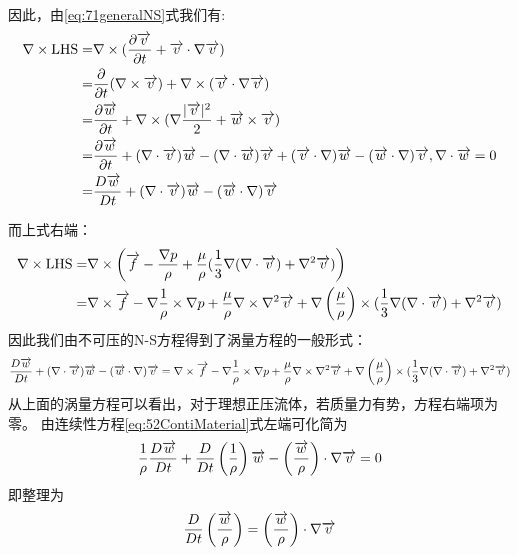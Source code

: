 因此，由\eqref{eq:71generalNS}式我们有:
\begin{align*}
\nabla\times \text{LHS}=& \nabla\times (\frac{\partial \overrightarrow{v}}{\partial t}+\overrightarrow{v}\cdot\nabla\overrightarrow{v})\\
=& \frac{\partial }{\partial t}(\nabla\times \overrightarrow{v})+\nabla\times(\overrightarrow{v}\cdot\nabla\overrightarrow{v}) \\
=& \frac{\partial \overrightarrow{w}}{\partial t}+\nabla\times(\nabla \frac{|\overrightarrow{v}|^2}{2}+\overrightarrow{w}\times \overrightarrow{v})\\
=& \frac{\partial \overrightarrow{w}}{\partial t} +(\nabla\cdot\overrightarrow{v})\overrightarrow{w}-(\nabla\cdot\overrightarrow{w})\overrightarrow{v}
+(\overrightarrow{v}\cdot\nabla)\overrightarrow{w}-(\overrightarrow{w}\cdot\nabla)\overrightarrow{v},\nabla\cdot\overrightarrow{w}=0 \\
=& \frac{D \overrightarrow{w}}{D t} +(\nabla \cdot \overrightarrow{v})\overrightarrow{w}-(\overrightarrow{w}\cdot\nabla)\overrightarrow{v}
\end{align*}

而上式右端：
\begin{align*}
\nabla\times \text{LHS}=& \nabla\times\left(\overrightarrow{f}-\frac{\nabla p}{\rho}+\frac{\mu}{\rho} (\frac{1}{3}\nabla(\nabla\cdot \overrightarrow{v})+\nabla^2 \overrightarrow{v})\right)\\
=& \nabla\times \overrightarrow{f}-\nabla\frac{1}{\rho}\times \nabla p + \frac{\mu}{\rho}\nabla\times \nabla^2\overrightarrow{v}+\nabla\left(\frac{\mu}{\rho}\right)\times(\frac{1}{3}\nabla(\nabla\cdot \overrightarrow{v})+\nabla^2 \overrightarrow{v})
\end{align*}
因此我们由不可压的N-S方程得到了涡量方程的一般形式：
\begin{equation}
\frac{D \overrightarrow{w}}{D t} +(\nabla \cdot \overrightarrow{v})\overrightarrow{w}-(\overrightarrow{w}\cdot\nabla)\overrightarrow{v}=\nabla\times \overrightarrow{f}-\nabla\frac{1}{\rho}\times \nabla p + \frac{\mu}{\rho}\nabla\times \nabla^2\overrightarrow{v}+\nabla\left(\frac{\mu}{\rho}\right)\times(\frac{1}{3}\nabla(\nabla\cdot \overrightarrow{v})+\nabla^2 \overrightarrow{v})
\end{equation}
从上面的涡量方程可以看出，对于理想正压流体，若质量力有势，方程右端项为零。
由连续性方程\eqref{eq:52ContiMaterial}式左端可化简为
\begin{equation}
\frac{1}{\rho}\frac{D\overrightarrow{w}}{Dt}+\frac{D}{Dt}\left(\frac{1}{\rho}\right) \overrightarrow{w}-\left(\frac{\overrightarrow{w}}{\rho}\right)\cdot \nabla \overrightarrow{v}=0
\end{equation}
即整理为
\begin{equation}
\frac{D}{Dt}\left(\frac{\overrightarrow{w}}{\rho}\right)=\left(\frac{\overrightarrow{w}}{\rho}\right)\cdot\nabla\overrightarrow{v}
\end{equation}



